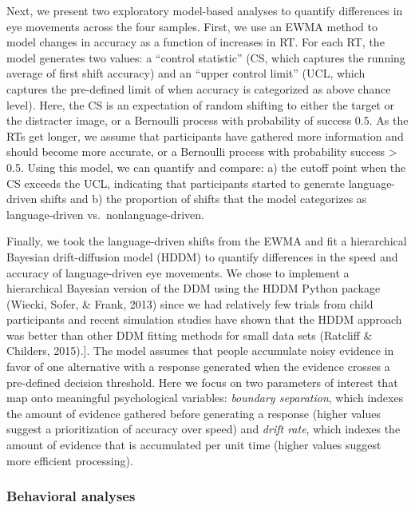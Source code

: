 \documentclass[10pt, letterpaper]{article}
\begin{document}
Next, we present two exploratory model-based analyses to quantify
differences in eye movements across the four samples. First, we use an
EWMA method to model changes in accuracy as a function of increases in
RT. For each RT, the model generates two values: a ``control statistic''
(CS, which captures the running average of first shift accuracy) and an
``upper control limit'' (UCL, which captures the pre-defined limit of
when accuracy is categorized as above chance level). Here, the CS is an
expectation of random shifting to either the target or the distracter
image, or a Bernoulli process with probability of success 0.5. As the
RTs get longer, we assume that participants have gathered more
information and should become more accurate, or a Bernoulli process with
probability success \textgreater{} 0.5. Using this model, we can
quantify and compare: a) the cutoff point when the CS exceeds the UCL,
indicating that participants started to generate language-driven shifts
and b) the proportion of shifts that the model categorizes as
language-driven vs.~nonlanguage-driven.

Finally, we took the language-driven shifts from the EWMA and fit a
hierarchical Bayesian drift-diffusion model (HDDM) to quantify
differences in the speed and accuracy of language-driven eye movements.
We chose to implement a hierarchical Bayesian version of the DDM using
the HDDM Python package (Wiecki, Sofer, \& Frank, 2013) since we had
relatively few trials from child participants and recent simulation
studies have shown that the HDDM approach was better than other DDM
fitting methods for small data sets (Ratcliff \& Childers, 2015).{]}.
The model assumes that people accumulate noisy evidence in favor of one
alternative with a response generated when the evidence crosses a
pre-defined decision threshold. Here we focus on two parameters of
interest that map onto meaningful psychological variables:
\emph{boundary separation}, which indexes the amount of evidence
gathered before generating a response (higher values suggest a
prioritization of accuracy over speed) and \emph{drift rate}, which
indexes the amount of evidence that is accumulated per unit time (higher
values suggest more efficient processing).

\subsubsection{Behavioral analyses}\label{behavioral-analyses}
\end{document}
